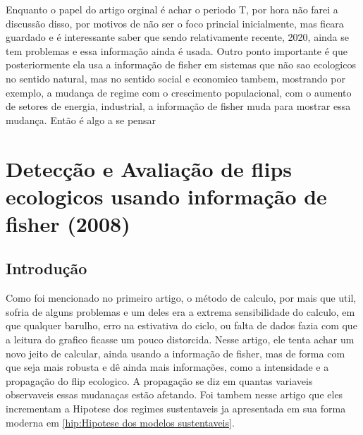 Enquanto o papel do artigo orginal é achar o periodo T, por hora não farei a discussão disso, por
motivos de não ser o foco princial inicialmente, mas ficara guardado e é interessante saber que
sendo relativamente recente, 2020, ainda se tem problemas e essa informação ainda é usada. Outro
ponto importante é que posteriormente ela usa a informação de fisher em sistemas que não sao
ecologicos no sentido natural, mas no sentido social e economico tambem, mostrando por exemplo, a
mudança de regime com o crescimento populacional, com o aumento de setores de energia, industrial, a
informação de fisher muda para mostrar essa mudança. Então é algo a se pensar
\section{Detecção e Avaliação de flips ecologicos usando informação de fisher (2008)}
\subsection{Introdução}
Como foi mencionado no primeiro artigo, o método de calculo, por mais que util, sofria de alguns
problemas e um deles era a extrema sensibilidade do calculo, em que qualquer barulho, erro na
estivativa do ciclo, ou falta de dados fazia com que a leitura do grafico ficasse um pouco
distorcida. Nesse artigo, ele tenta achar um novo jeito de calcular, ainda usando a informação de
fisher, mas de forma com que seja mais robusta e dê ainda mais informações, como a intensidade e a
propagação do flip ecologico. A propagação se diz em quantas variaveis observaveis essas mudanaças
estão afetando. Foi tambem nesse artigo que eles incrementam a Hipotese dos regimes sustentaveis ja
apresentada em sua forma moderna em \ref{hip:Hipotese dos modelos sustentaveis}. \par
